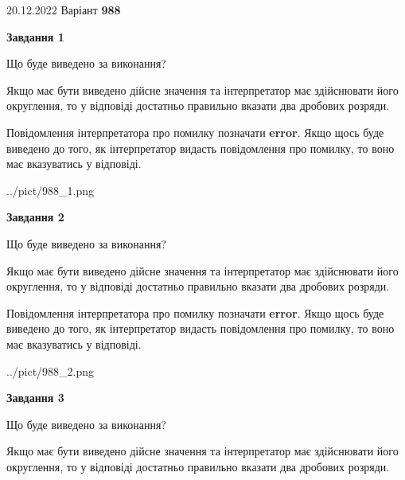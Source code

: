 \documentclass[12pt, ukrainian]{article}
\begin{document}
{20.12.2022 Варіант \No \textbf { 988 }\par}
{
\begin {Large}

{\begin {center}\textbf{Завдання 1}\end {center}}\par
Що буде виведено за виконання? \par

Якщо має бути виведено дійсне значення та інтерпретатор має здійснювати його округлення, 
то у відповіді достатньо правильно вказати два дробових розряди.

Повідомлення інтерпретатора про помилку позначати \textbf{error}.
Якщо щось буде виведено до того, як інтерпретатор видасть повідомлення про помилку, 
то воно має вказуватись у відповіді. \par

\begin{center}
	{../pict/988_1.png}
\end{center}
\newpage

{\begin {center}\textbf{Завдання 2}\end {center}}\par
Що буде виведено за виконання? \par

Якщо має бути виведено дійсне значення та інтерпретатор має здійснювати його округлення, 
то у відповіді достатньо правильно вказати два дробових розряди.

Повідомлення інтерпретатора про помилку позначати \textbf{error}.
Якщо щось буде виведено до того, як інтерпретатор видасть повідомлення про помилку, 
то воно має вказуватись у відповіді. \par

\begin{center}
	{../pict/988_2.png}
\end{center}
\newpage

{\begin {center}\textbf{Завдання 3}\end {center}}\par
Що буде виведено за виконання? \par

Якщо має бути виведено дійсне значення та інтерпретатор має здійснювати його округлення, 
то у відповіді достатньо правильно вказати два дробових розряди.


\end{Large}}
\end{document}
